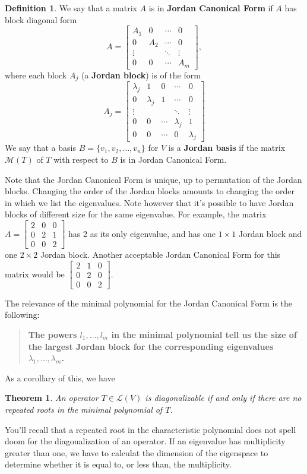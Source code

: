 \documentclass[12pt,letterpaper]{article}
\newtheorem{theorem}{Theorem}
\theoremstyle{definition}
\newtheorem{definition}{Definition}
\renewcommand{\L}{\mathcal{L}}
\newcommand{\M}{\mathcal{M}}
\begin{document}
\begin{definition}
 We say that a matrix $A$ is in {\bf Jordan Canonical Form} if $A$ has block diagonal form
\[
 A=\begin{bmatrix}
  A_1 &0&\cdots &0\\0&A_2&\cdots &0\\ \vdots & & \ddots & \vdots\\0&0&\cdots& A_m\end{bmatrix},
 \]
where each block $A_j$ (a {\bf Jordan block}) is of the form
\[
 A_j = \begin{bmatrix}
        \lambda_j&1&0&\cdots & 0\\
 0&\lambda_j&1&\cdots & 0\\
 \vdots& &&\ddots&\vdots\\
0&0&\cdots&\lambda_j &1\\
0&0&\cdots&0 &\lambda_j
       \end{bmatrix}
\]
We say that a basis $B=\{v_1,v_2,\ldots, v_n\}$ for $V$ is a {\bf Jordan basis} if the matrix $\M(T)$ of $T$ with respect to $B$ is in Jordan Canonical Form.
\end{definition}
Note that the Jordan Canonical Form is unique, up to permutation of the Jordan blocks. Changing the order of the Jordan blocks amounts to changing the order in which we list the eigenvalues. Note however that it's possible to have Jordan blocks of different size for the same eigenvalue. For example, the matrix $A=\begin{bmatrix}2&0&0\\0&2&1\\0&0&2\end{bmatrix}$ has 2 as its only eigenvalue, and has one $1\times 1$ Jordan block and one $2\times 2$ Jordan block. Another acceptable Jordan Canonical Form for this matrix would be $\begin{bmatrix}2&1&0\\0&2&0\\0&0&2\end{bmatrix}$.

\bigskip

The relevance of the minimal polynomial for the Jordan Canonical Form is the following:
\begin{quotation}
 {\bf The powers $l_1,\ldots, l_m$ in the minimal polynomial tell us the size of the largest Jordan block for the corresponding eigenvalues $\lambda_1,\ldots, \lambda_m$.}
\end{quotation}
As a corollary of this, we have
\begin{theorem}
 An operator $T\in\L(V)$ is diagonalizable if and only if there are no repeated roots in the minimal polynomial of $T$.
\end{theorem}
You'll recall that a repeated root in the characteristic polynomial does not spell doom for the diagonalization of an operator. If an eigenvalue has multiplicity greater than one, we have to calculat the dimension of the eigenspace to determine whether it is equal to, or less than, the multiplicity.
\end{document}
